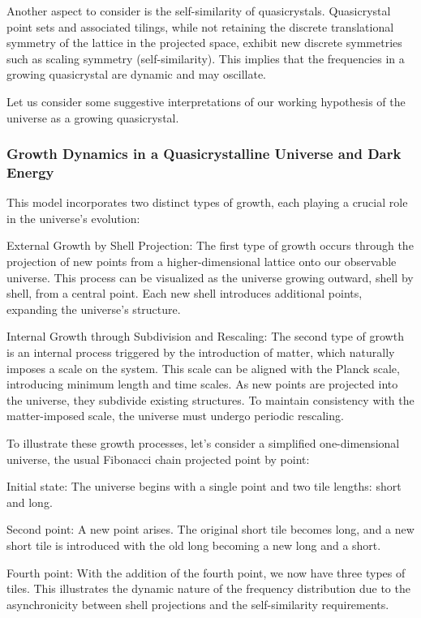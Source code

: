 \documentclass{article}
\begin{document}
Another aspect to consider is the self-similarity of quasicrystals. Quasicrystal point sets and associated tilings, while not retaining the discrete translational symmetry of the lattice in the projected space, exhibit new discrete symmetries such as scaling symmetry (self-similarity). This implies that the frequencies in a growing quasicrystal are dynamic and may oscillate.



Let us consider some suggestive interpretations of our working hypothesis of the universe as a growing quasicrystal. 

\subsubsection{Growth Dynamics in a Quasicrystalline Universe and Dark Energy}
This model incorporates two distinct types of growth, each playing a crucial role in the universe's evolution:

External Growth by Shell Projection:
The first type of growth occurs through the projection of new points from a higher-dimensional lattice onto our observable universe. This process can be visualized as the universe growing outward, shell by shell, from a central point. Each new shell introduces additional points, expanding the universe's structure.

Internal Growth through Subdivision and Rescaling:
The second type of growth is an internal process triggered by the introduction of matter, which naturally imposes a scale on the system. This scale can be aligned with the Planck scale, introducing minimum length and time scales. As new points are projected into the universe, they subdivide existing structures. To maintain consistency with the matter-imposed scale, the universe must undergo periodic rescaling.

To illustrate these growth processes, let's consider a simplified one-dimensional universe, the usual Fibonacci chain projected point by point:

Initial state: The universe begins with a single point and two tile lengths: short and long.

Second point: A new point arises. The original short tile becomes long, and a new short tile is introduced with the old long becoming a new long and a short.

Fourth point: With the addition of the fourth point, we now have three types of tiles. This illustrates the dynamic nature of the frequency distribution due to the asynchronicity between shell projections and the self-similarity requirements.
\end{document}
